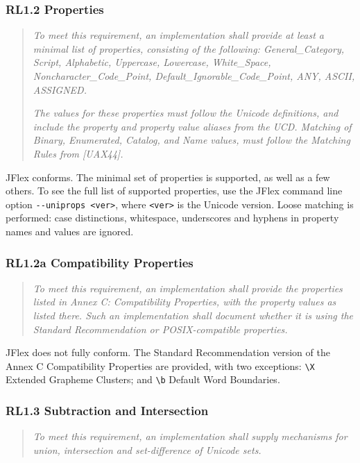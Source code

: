 \documentclass[11pt]{scrartcl}
\begin{document}
\subsubsection*{RL1.2 Properties}

\begin{quote}
\emph{To meet this requirement, an implementation shall provide at least a
minimal list of properties, consisting of the following: General\_Category,
Script, Alphabetic, Uppercase, Lowercase, White\_Space,
Noncharacter\_Code\_Point, Default\_Ignor\-able\_Code\_Point, ANY, ASCII,
ASSIGNED.}

\emph{The values for these properties must follow the Unicode definitions, 
and include the property and property value aliases from the UCD. Matching
of Binary, Enumerated, Catalog, and Name values, must follow the
Matching Rules from [UAX44].}
\end{quote}

JFlex conforms.  The minimal set of properties is supported, as well as
a few others. To see the full list of supported properties, use the JFlex
command line option \verb+--uniprops <ver>+, where \verb+<ver>+ is the
Unicode version.  Loose matching is performed: case distinctions, 
whitespace, underscores and hyphens in property names and values are
ignored.

\subsubsection*{RL1.2a Compatibility Properties}

\begin{quote}
\emph{To meet this requirement, an implementation shall provide the properties
listed in Annex C: Compatibility Properties, with the property values as
listed there. Such an implementation shall document whether it is using
the Standard Recommendation or POSIX-compatible properties.}
\end{quote}

JFlex does not fully conform. The Standard Recommendation version of the
Annex C Compatibility Properties are provided, with two exceptions:
\verb+\X+ Extended Grapheme Clusters; and \verb+\b+ Default Word
Boundaries.

\subsubsection*{RL1.3 Subtraction and Intersection}

\begin{quote}
\emph{To meet this requirement, an implementation shall supply mechanisms for
union, intersection and set-difference of Unicode sets.}
\end{quote}
\end{document}
